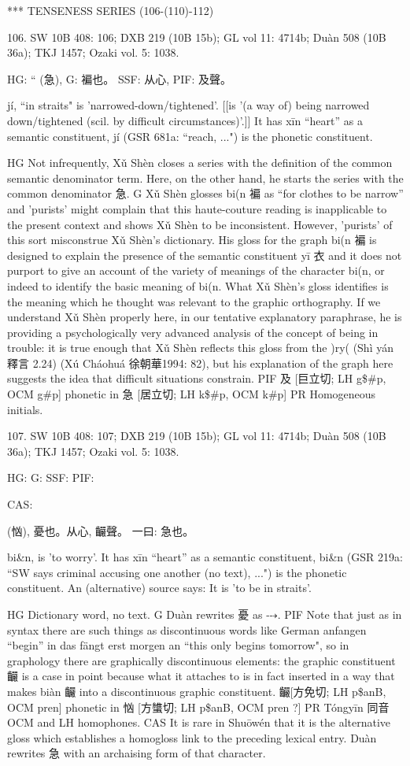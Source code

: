 ***
TENSENESS SERIES (106-(110)-112)

106. SW 10B 408: 106; DXB 219 (10B 15b); GL vol 11: 4714b; Duàn 508 (10B 36a); TKJ 1457; Ozaki vol. 5: 1038.

HG: `` (急),
G:	褊也。
SSF: 从心,
PIF: 及聲。


jí, ``in straits"
is 'narrowed-down/tightened'. [[is '(a way of) being narrowed down/tightened (scil. by difficult circumstances)'.]]
It has xīn ``heart'' as a semantic constituent,
jí (GSR 681a: ``reach, ...") is the phonetic constituent.

HG Not infrequently, Xǔ Shèn closes a series with the definition of the common semantic denominator term. Here, on the other hand, he starts the series with the common denominator 急.
G Xǔ Shèn glosses bi(n 褊 as ``for clothes to be narrow'' and 'purists' might complain that this haute-couture reading is inapplicable to the present context and shows Xǔ Shèn to be inconsistent. However, 'purists' of this sort misconstrue Xǔ Shèn's dictionary. His gloss for the graph bi(n 褊 is designed to explain the presence of the semantic constituent yī 衣 and it does not purport to give an account of the variety of meanings of the character bi(n, or indeed to identify the basic meaning of bi(n. What Xǔ Shèn's gloss identifies is the meaning which he thought was relevant to the graphic orthography.
    If we understand Xǔ Shèn properly here, in our tentative explanatory paraphrase, he is providing a psychologically very advanced analysis of the concept of being in trouble: it is true enough that Xǔ Shèn reflects this gloss from the )ry( (Shì yán 釋言 2.24) (Xú Cháohuá 徐朝華1994: 82), but his explanation of the graph here suggests the idea that difficult situations constrain.
PIF   及 [巨立切; LH g\$\#p, OCM g\#p] phonetic in 急 [居立切; LH k\$\#p, OCM k\#p]
PR   Homogeneous initials.



107. SW 10B 408: 107; DXB 219 (10B 15b); GL vol 11: 4714b; Duàn 508 (10B 36a); TKJ 1457; Ozaki vol. 5: 1038.


HG:
G: SSF: PIF:

CAS:

(忷),
憂也。从心, 䶫聲。
一曰: 急也。

bi&n,
is 'to worry'.
It has xīn ``heart'' as a semantic constituent,
bi&n (GSR 219a: ``SW says criminal accusing one another (no text), ...") is the phonetic constituent.
An (alternative) source says: It is 'to be in straits'.

HG Dictionary word, no text.
G    Duàn rewrites 憂 as ⤏.
PIF Note that just as in syntax there are such things as discontinuous words like German anfangen ``begin'' in das fängt erst morgen an ``this only begins tomorrow", so in graphology there are graphically discontinuous elements: the graphic constituent 䶫 is a case in point because what it attaches to is in fact inserted in a way that makes biàn 䶫 into a discontinuous graphic constituent.
䶫[方免切; LH p\$anB, OCM pren] phonetic in 忷 [方䗽切; LH p\$anB, OCM pren ?]
PR   Tóngyīn 同音 OCM and LH homophones.
CAS It is rare in Shuōwén that it is the alternative gloss which establishes a homogloss link to the preceding lexical entry.
Duàn rewrites 急 with an archaising form of that character.

